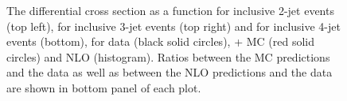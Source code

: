 \begin{figure}[!htbp]
\begin{center}
    \caption{The differential cross section as a function \httwo for inclusive 2-jet events (top left), for 
      inclusive 3-jet events (top right) and for inclusive 4-jet events (bottom), for data (black solid circles), \MadGraphF + \PYTHIAS MC 
      (red solid circles) and NLO 
      (histogram). Ratios between the MC predictions and the data as well as between the NLO predictions and the data are shown in bottom panel 
      of each plot.}
    \label{fig:comp_all}
  \end{center}
\end{figure}

